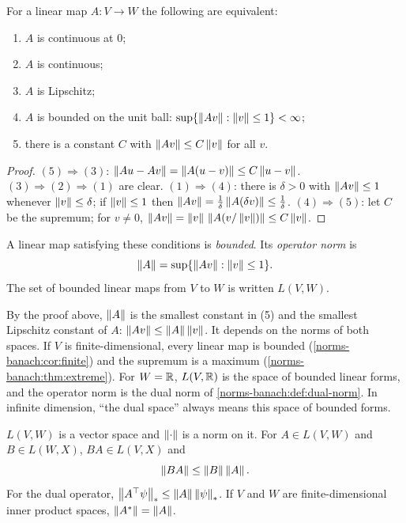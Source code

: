 \begin{notechapter}
\begin{theorem}\label{norms-banach:thm:bounded}
For a linear map $A:V\to W$ the following are equivalent:
\begin{enumerate}[nosep]
  \item $A$ is continuous at $0$;
  \item $A$ is continuous;
  \item $A$ is Lipschitz;
  \item $A$ is bounded on the unit ball:
        $\sup\{\left\|Av\right\| : \left\|v\right\|\leq1\} < \infty$;
  \item there is a constant $C$ with $\left\|Av\right\|\leq C\left\|v\right\|$ for all $v$.
\end{enumerate}
\end{theorem}

\begin{proof}
$(5)\Rightarrow(3)$: $\left\|Au - Av\right\| = \left\|A(u - v)\right\|\leq C\left\|u - v\right\|$.
$(3)\Rightarrow(2)\Rightarrow(1)$ are clear. $(1)\Rightarrow(4)$: there is
$\delta > 0$ with $\left\|Av\right\|\leq1$ whenever $\left\|v\right\|\leq\delta$; if
$\left\|v\right\|\leq1$ then $\left\|Av\right\| = \frac1\delta\left\|A(\delta v)\right\|
\leq\frac1\delta$. $(4)\Rightarrow(5)$: let $C$ be the supremum; for
$v\neq0$, $\left\|Av\right\| = \left\|v\right\|\,\left\|A(v/\left\|v\right\|)\right\|\leq C\left\|v\right\|$.
\end{proof}

\begin{definition}\label{norms-banach:def:opnorm}
A linear map satisfying these conditions is \emph{bounded}. Its
\emph{operator norm} is
\[
  \left\|A\right\| = \sup\{\left\|Av\right\| : \left\|v\right\|\leq1\} .
\]
The set of bounded linear maps from $V$ to $W$ is written $L(V, W)$.
\end{definition}

By the proof above, $\left\|A\right\|$ is the smallest constant in (5) and the
smallest Lipschitz constant of $A$: $\left\|Av\right\|\leq\left\|A\right\|\left\|v\right\|$. It
depends on the norms of both spaces. If $V$ is finite-dimensional, every
linear map is bounded (\cref{norms-banach:cor:finite}) and the supremum is
a maximum (\cref{norms-banach:thm:extreme}). For $W = \mathbb{R}$, $L(V, \mathbb{R})$ is
the space of bounded linear forms, and the operator norm is the dual norm
of \cref{norms-banach:def:dual-norm}. In infinite dimension, ``the dual
space'' always means this space of bounded forms.

\begin{proposition}
\label{norms-banach:prop:opnorm}
$L(V, W)$ is a vector space and $\left\|\cdot\right\|$ is a norm on it. For
$A\in L(V, W)$ and $B\in L(W, X)$, $BA\in L(V, X)$ and
\[
  \left\|BA\right\|\leq\left\|B\right\|\left\|A\right\| .
\]
For the dual operator, $\left\|A^{\top}\psi\right\|_*\leq\left\|A\right\|\left\|\psi\right\|_*$. If $V$
and $W$ are finite-dimensional inner product spaces,
$\left\|A^{*}\right\| = \left\|A\right\|$.
\end{proposition}


\end{notechapter}
